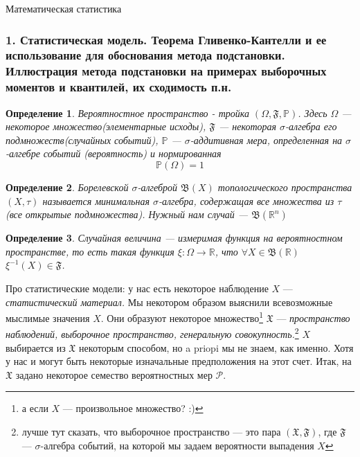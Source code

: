 \documentclass[12pt, russian]{article}
\begin{document}
\newtheorem{lemma}{Лемма}
\newtheorem{theorem}{Теорема} 
\newtheorem{mydef}{Определение}
\newcommand{\probcov}{\xrightarrow{\text{п.н.}}}
\newcommand{\alprob}{\text{ п.н.}}
\newcommand{\integr}[1]{\int\limits_A{{#1}(\omega)\cdot\mathbb{P}(d\omega)}}
\newcommand{\expon}[1]{\exp{\left\{{#1}\right\}}}
\newcommand{\proj}[2]{\text{proj}_{#1}{#2}}

\begin{center}
	\begin{Huge}
		Математическая статистика
	\end{Huge}
\end{center}

\subsubsection*{1. Статистическая модель. Теорема Гливенко-Кантелли и ее использование для обоснования метода подстановки. Иллюстрация метода подстановки на примерах выборочных моментов и квантилей, их сходимость п.н.}

\begin{mydef}
Вероятностное пространство - тройка $(\Omega, \mathfrak{F}, \mathbb{P})$. 
Здесь $\Omega$ --- некоторое множество({\it элементарные исходы}), $\mathfrak{F}$ --- некоторая $\sigma$-алгебра его подмножеств({\it случайных событий}), $\mathbb{P}$ --- $\sigma$-аддитивная мера, определенная на $\sigma$-алгебре событий  ({\it вероятность}) и нормированная
$$ \mathbb{P}(\Omega) = 1 $$
\end{mydef}

\begin{mydef}
Борелевской $\sigma$-алгеброй $\mathfrak{B}(X)$ топологического пространства $(X, \tau)$ называется минимальная $\sigma$-алгебра, содержащая все множества из $\tau$ (все открытые подмножества). Нужный нам случай --- $\mathfrak{B}(\mathbb{R}^n)$
\end{mydef}

\begin{mydef}
Случайная величина --- измеримая функция на вероятностном пространстве, то есть такая функция $\xi : \Omega \rightarrow \mathbb{R}$, что $\forall X\in\mathfrak{B}(\mathbb{R})$ $\xi^{-1}(X)\in\mathfrak{F}$.
\end{mydef}

Про статистические модели: у нас есть некоторое наблюдение $X$ --- {\it статистический материал.} Мы некотором образом выяснили всевозможные мыслимые значения $X$. Они образуют некоторое множество\footnote{а если $X$ --- произвольное множество? :)} $\mathfrak{X}$ --- {\it пространство наблюдений, выборочное пространство, генеральную совокупность.}\footnote{лучше тут сказать, что выборочное пространство --- это пара $(\mathfrak{X}, \mathfrak{F})$, где $\mathfrak{F}$ --- $\sigma$-алгебра событий, на которой мы задаем вероятности выпадения $X$} $X$ выбирается из $\mathfrak{X}$ некоторым способом, но a priopi мы не знаем, как именно. Хотя у нас и могут быть некоторые изначальные предположения на этот счет. Итак, на $\mathfrak{X}$ задано некоторое семество вероятностных мер $\mathcal{P}$. 
\end{document}
